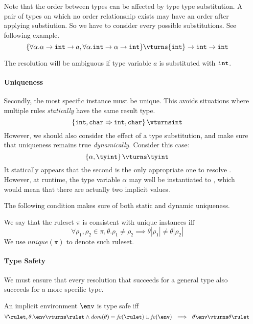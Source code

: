 Note that the order between types can be affected by type type substitution.
A pair of types on which no order relationship exists may have an order after 
applying substiution. So we have to consider every possible substitutions.
See following example.
\[
\{
  \forall \alpha. \alpha \rightarrow {\tt int} \rightarrow a,
  \forall \alpha. {\tt int} \rightarrow \alpha  \rightarrow {\tt int} 
\} 
\vturns {\tt int} \rightarrow {\tt int} \rightarrow {\tt int}
\]

The resolution will be ambiguous if type variable $a$ is substituted with ${\tt int}$.

\paragraph{Uniqueness}
Secondly, the most specific instance must be unique. This avoids situations
where multiple rules \textit{statically} have the same result type.
\begin{equation*}
\left\{ \texttt{int}, \texttt{char} \Rightarrow \texttt{int}, \texttt{char} \right\} 
\vturns \texttt{int}
\end{equation*}
However, we should also consider the effect of a type substitution, and make
sure that uniqueness remains true \textit{dynamically}. Consider this case:
\begin{equation*}
\left\{ \alpha, \tyint \right\} \vturns \tyint
\end{equation*}
It statically appears that the second is the only appropriate one to resolve
\tyint. However, at runtime, the type variable $\alpha$ may well be
instantiated to \tyint, which would mean that there are actually two
implicit \tyint values.

The following condition makes sure of both static and dynamic uniqueness.
\begin{definition}
We say that the ruleset $\pi$ is consistent with unique instances iff 
\[
\forall \rho_1,\rho_2 \in \pi, \theta. 
  \rho_1 \neq \rho_2
  \implies \theta |\rho_1| \neq \theta |\rho_2|
\]
We use $\mathit{unique}(\pi)$ to denote such ruleset.
\end{definition}

\paragraph{Type Safety}
We must ensure that every resolution that succeeds for a general type also
succeeds for a more specific type.
\begin{definition}
An implicit environment $\env$ is type safe iff
\begin{equation*}
\forall \rulet, \theta  . \env \vturns \rulet \wedge \mathit{dom}(\theta) = \mathit{fv}(\rulet) \cup \mathit{fv}(\env)
~~\Longrightarrow~~ 
\theta\env \vturns \theta\rulet
\end{equation*}
\end{definition}

